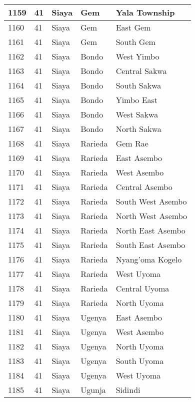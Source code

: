\begin{table}[!ht]
\begin{tabular}{|l|l|l|l|l|}
        1159 & 41 & Siaya & Gem & Yala Township \\ \hline
        1160 & 41 & Siaya & Gem & East Gem \\ \hline
        1161 & 41 & Siaya & Gem & South Gem \\ \hline
        1162 & 41 & Siaya & Bondo & West Yimbo \\ \hline
        1163 & 41 & Siaya & Bondo & Central Sakwa \\ \hline
        1164 & 41 & Siaya & Bondo & South Sakwa \\ \hline
        1165 & 41 & Siaya & Bondo & Yimbo East \\ \hline
        1166 & 41 & Siaya & Bondo & West Sakwa \\ \hline
        1167 & 41 & Siaya & Bondo & North Sakwa \\ \hline
        1168 & 41 & Siaya & Rarieda & Gem Rae \\ \hline
        1169 & 41 & Siaya & Rarieda & East Asembo \\ \hline
        1170 & 41 & Siaya & Rarieda & West Asembo \\ \hline
        1171 & 41 & Siaya & Rarieda & Central Asembo \\ \hline
        1172 & 41 & Siaya & Rarieda & South West Asembo \\ \hline
        1173 & 41 & Siaya & Rarieda & North West Asembo \\ \hline
        1174 & 41 & Siaya & Rarieda & North East Asembo \\ \hline
        1175 & 41 & Siaya & Rarieda & South East Asembo \\ \hline
        1176 & 41 & Siaya & Rarieda & Nyang’oma Kogelo \\ \hline
        1177 & 41 & Siaya & Rarieda & West Uyoma \\ \hline
        1178 & 41 & Siaya & Rarieda & Central Uyoma \\ \hline
        1179 & 41 & Siaya & Rarieda & North Uyoma \\ \hline
        1180 & 41 & Siaya & Ugenya & East Asembo \\ \hline
        1181 & 41 & Siaya & Ugenya & West Asembo \\ \hline
        1182 & 41 & Siaya & Ugenya & North Uyoma \\ \hline
        1183 & 41 & Siaya & Ugenya & South Uyoma \\ \hline
        1184 & 41 & Siaya & Ugenya & West Uyoma \\ \hline
        1185 & 41 & Siaya & Ugunja & Sidindi \\ \hline

\end{tabular}
\end{table}
